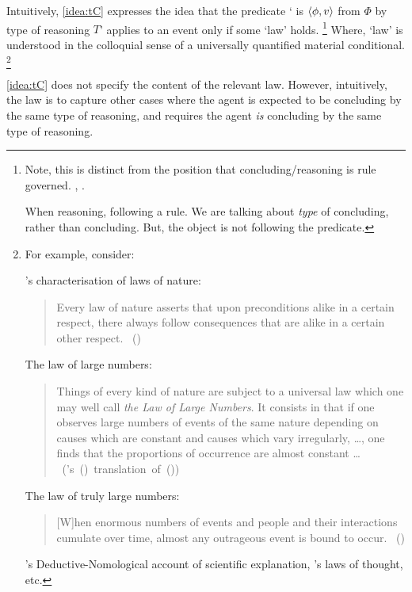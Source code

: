 \begin{note}
  \noindent%
  Intuitively, \autoref{idea:tC} expresses the idea that the predicate `\vAgent{} is \tCV{} \(\langle \phi, v \rangle\) from \(\Phi\) by type of reasoning \(T\)' applies to an event only if some `law' holds.%
  \footnote{
    Note, this is distinct from the position that concluding/reasoning is rule governed.
    \cite{Boghossian:2008vf,Boghossian:2012vb}, \cite{Broome:2002aa}.

    When reasoning, following a rule.
    We are talking about \emph{type} of concluding, rather than concluding.
    But, the object is not following the predicate.
  }
  Where, `law' is understood in the colloquial sense of a universally quantified material conditional.%
  \footnote{
    For example, consider:

    \citeauthor{Helmholtz:1977aa}'s characterisation of laws of nature:%
    \begin{quote}
      \nocite{Wilson:2006aa}
      Every law of nature asserts that upon preconditions alike in a certain respect, there always follow consequences that are alike in a certain other respect.%
      \mbox{ }\hfill\mbox{(\citeyear[122]{Helmholtz:1977aa})}
    \end{quote}
    The law of large numbers:
    \begin{quote}
      Things of every kind of nature are subject to a universal law which one may well call \emph{the Law of Large Numbers}.
      It consists in that if one observes large numbers of events of the same nature depending on causes which are constant and causes which vary irregularly, \dots, one finds that the proportions of occurrence are almost constant \dots\newline
      \mbox{ }\hfill\mbox{(\citeauthor{Seneta:2013aa}'s (\citeyear[9--10]{Seneta:2013aa}) translation of (\cite[7]{Poisson:1837aa}))}
    \end{quote}
    The law of truly large numbers:
    \begin{quote}
      [W]hen enormous numbers of events and people and their interactions cumulate over time, almost any outrageous event is bound to occur.%
      \mbox{ }\hfill\mbox{(\cite[853]{Diaconis:1989aa})}
    \end{quote}
    \citeauthor{Hempel:1965aa}'s Deductive-Nomological account of scientific explanation, \citeauthor{Boole:1854aa}'s laws of thought, etc.
  }

  \autoref{idea:tC} does not specify the content of the relevant law.
  However, intuitively, the law is to capture other cases where the agent is expected to be concluding by the same type of reasoning, and requires the agent \emph{is} concluding by the same type of reasoning.
\end{note}

